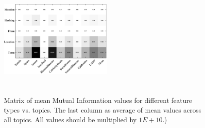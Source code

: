 \begin{figure}[t!]
\centering
\includegraphics[width=0.5\textwidth, height=60mm]{images/avgMI_gray.pdf}
\caption{Matrix of mean Mutual Information values for different feature types vs. topics.  The last column as average of mean values across all topics.  All values should be multiplied by $1E+10$.)}
\label{fig:avgMI}
\end{figure}

